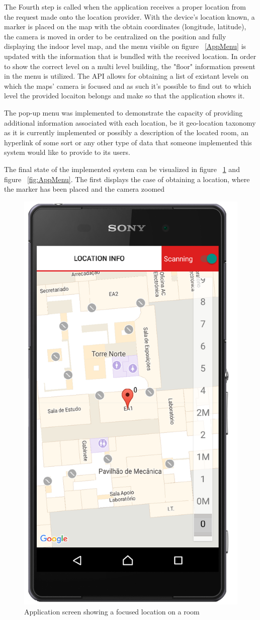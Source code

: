 \documentclass[a4paper]{IEEEtran}
\begin{document}
The Fourth step is called when the application receives a proper location from the request made onto the location provider. With the device's location known, a marker is placed on the map with the obtain coordinates (longitude, latitude), the camera is moved in order to be centralized on the position and fully displaying the indoor level map, and the menu visible on figure ~\ref{AppMenu} is updated with the information that is bundled with the received location. In order to show the correct level on a multi level building, the "floor" information present in the menu is utilized. The API allows for obtaining a list of existant levels on which the maps' camera is focused and as such it's possible to find out to which level the provided locaiton belongs and make so that the application shows it.

The pop-up menu was implemented to demonstrate the capacity of providing additional information associated with each location, be it geo-location taxonomy as it is currently implemented or possibly a description of the located room, an hyperlink of some sort or any other type of data that someone implemented this system would like to provide to its users.  

The final state of the implemented system can be visualized in figure ~\ref{fig:AppFocus} and figure ~\ref{fig:AppMenu}. The first displays the case of obtaining a location, where the marker has been placed and the camera zoomed

\begin{figure}
	\centering
		\includegraphics[width=0.5\linewidth]{figures/app_focused.png}
	\caption[Application screen showing a focused location on a room]{Application screen showing a focused location on a room}
	\label{fig:AppFocus}
\end{figure}
\end{document}
